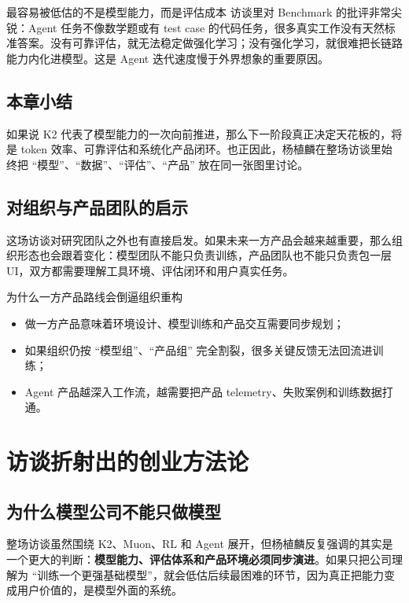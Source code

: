 \documentclass[a4paper]{article}
\begin{document}
\begin{warningbox}{最容易被低估的不是模型能力，而是评估成本}
访谈里对 Benchmark 的批评非常尖锐：Agent 任务不像数学题或有 test case 的代码任务，很多真实工作没有天然标准答案。没有可靠评估，就无法稳定做强化学习；没有强化学习，就很难把长链路能力内化进模型。这是 Agent 迭代速度慢于外界想象的重要原因。
\end{warningbox}

\subsection{本章小结}
如果说 K2 代表了模型能力的一次向前推进，那么下一阶段真正决定天花板的，将是 token 效率、可靠评估和系统化产品闭环。也正因此，杨植麟在整场访谈里始终把 ``模型''、``数据''、``评估''、``产品'' 放在同一张图里讨论。

\subsection{对组织与产品团队的启示}
这场访谈对研究团队之外也有直接启发。如果未来一方产品会越来越重要，那么组织形态也会跟着变化：模型团队不能只负责训练，产品团队也不能只负责包一层 UI，双方都需要理解工具环境、评估闭环和用户真实任务。

\begin{knowledgebox}{为什么一方产品路线会倒逼组织重构}
\begin{itemize}
    \item 做一方产品意味着环境设计、模型训练和产品交互需要同步规划；
    \item 如果组织仍按 ``模型组''、``产品组'' 完全割裂，很多关键反馈无法回流进训练；
    \item Agent 产品越深入工作流，越需要把产品 telemetry、失败案例和训练数据打通。
\end{itemize}
\end{knowledgebox}

\section{访谈折射出的创业方法论}

\subsection{为什么模型公司不能只做模型}
整场访谈虽然围绕 K2、Muon、RL 和 Agent 展开，但杨植麟反复强调的其实是一个更大的判断：\textbf{模型能力、评估体系和产品环境必须同步演进}。如果只把公司理解为 ``训练一个更强基础模型''，就会低估后续最困难的环节，因为真正把能力变成用户价值的，是模型外面的系统。
\end{document}

